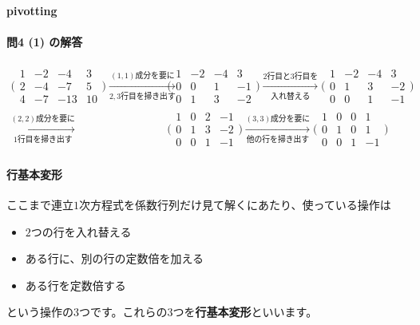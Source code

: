\paragraph{pivotting} %

\paragraph{問4 (1) の解答}
\begin{align*}
\Biggl(
\begin{array}{rrr|r}
1 & -2 & -4 & 3 \\
2 & -4 & -7 & 5 \\
4 & -7 & -13 & 10
\end{array}
\Biggr) \xrightarrow[\text{$2,3$行目を掃き出す}]{\text{$(1,1)$成分を要に}}
& \Biggl(
\begin{array}{rrr|r}
1 & -2 & -4 & 3 \\
0 & 0 & 1 & -1 \\
0 & 1 & 3 & -2
\end{array}
\Biggr) \xrightarrow[入れ替える]{\text{$2$行目と$3$行目を}}
\Biggl(
\begin{array}{rrr|r}
1 & -2 & -4 & 3 \\
0 & 1 & 3 & -2 \\
0 & 0 & 1 & -1
\end{array}
\Biggr) \\ \xrightarrow[\text{$1$行目を掃き出す}]{\text{$(2,2)成分を要に$}}
& \Biggl(
\begin{array}{rrr|r}
1 & 0 & 2 & -1 \\
0 & 1 & 3 & -2 \\
0 & 0 & 1 & -1
\end{array}
\Biggr) \xrightarrow[\text{他の行を掃き出す}]{\text{$(3,3)$成分を要に}}
\Biggl(
\begin{array}{rrr|r}
1 & 0 & 0 & 1 \\
0 & 1 & 0 & 1 \\
0 & 0 & 1 & -1
\end{array}
\Biggr)
\end{align*}

\paragraph{行基本変形}
ここまで連立$1$次方程式を係数行列だけ見て解くにあたり、使っている操作は
\begin{itemize}
\item $2$つの行を入れ替える
\item ある行に、別の行の定数倍を加える
\item ある行を定数倍する
\end{itemize}
という操作の$3$つです。これらの$3$つを\textbf{行基本変形}といいます。

